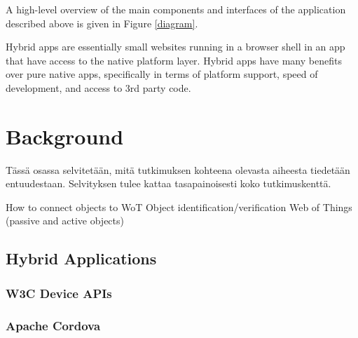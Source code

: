 \documentclass[english,12pt,a4paper,pdftex]{article}
\begin{document}
A high-level overview of the main components and interfaces of the application described above is given in Figure \ref{diagram}.

Hybrid apps are essentially small websites running in a browser shell in an app that have access to the native platform layer. Hybrid apps have many benefits over pure native apps, specifically in terms of platform support, speed of development, and access to 3rd party code.







\clearpage

\section{Background}

Tässä osassa selvitetään, mitä tutkimuksen kohteena olevasta
aiheesta tiedetään entuudestaan. Selvityksen tulee kattaa
tasapainoisesti koko tutkimuskenttä.

How to connect objects to WoT
Object identification/verification
Web of Things (passive and active objects)

\subsection{Hybrid Applications}
\subsubsection{W3C Device APIs}
\subsubsection{Apache Cordova}
\end{document}
